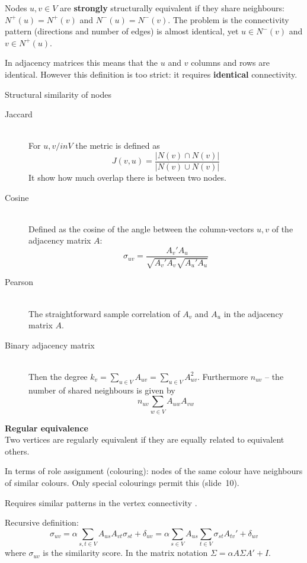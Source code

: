 \documentclass[a4paper]{article}
\begin{document}
Nodes $u, v\in V$ are \textbf{strongly} structurally equivalent if they share neighbours: $N^+(u) = N^+(v)$ and $N^-(u) = N^-(v)$. The problem is the connectivity pattern (directions and number of edges) is almost identical, yet $u\in N^-(v)$ and $v\in N^+(u)$.

In adjacency matrices this means that the $u$ and $v$ columns and rows are identical. However this definition is too strict: it requires \textbf{identical} connectivity.

Structural similarity of nodes

\begin{description}
	\item[Jaccard] \hfill\\
	For $u,v/in V$ the metric is defined as \[J(v,u) = \frac{\big\lvert N(v) \cap N(v) \big\rvert}{\big\lvert N(v) \cup N(v) \big\rvert}\] It show how much overlap there is between two nodes.
	\item[Cosine] \hfill\\
	Defined as the cosine of the angle between the column-vectors $u,v$ of the adjacency matrix $A$:
	\[\sigma_{uv} = \frac{ A_v'A_u }{\sqrt{ A_v'A_v }\sqrt{ A_u'A_u }}\]
	\item[Pearson]\hfill\\
	The straightforward sample correlation of $A_v$ and $A_u$ in the adjacency matrix $A$.
	\item[Binary adjacency matrix] \hfill\\
	Then the degree $k_v = \sum_{u\in V} A_{uv} = \sum_{u\in V} A_{uv}^2$. Furthermore $n_{uv}$ -- the number of shared neighbours is given by 
	\[n_{uv}\sum_{w\in V} A_{uw}A_{vw}\]
\end{description}

\noindent\textbf{Regular equivalence}\hfill\\
Two vertices are regularly equivalent if they are equally related to equivalent others.

In terms of role assignment (colouring): nodes of the same colour have neighbours of similar colours. Only special colourings permit this (slide~10).


Requires similar patterns in the vertex connectivity .

Recursive definition:
\[\sigma_{uv} = \alpha \sum_{s,t\in V} A_{us} A_{vt} \sigma_{st} + \delta_{uv} = \alpha \sum_{s\in V} A_{us} \sum_{t\in V} \sigma_{st} A_{tv}' + \delta_{uv}\]
where $\sigma_{uv}$ is the similarity score. In the matrix notation $\Sigma = \alpha A\Sigma A' + I$.
\end{document}

